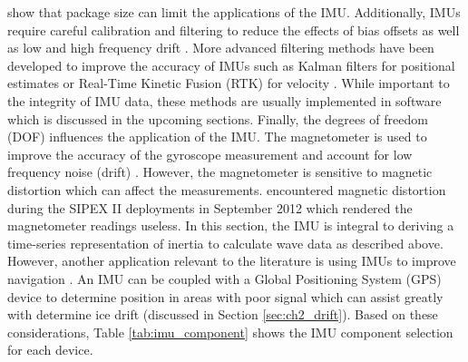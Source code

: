 \textcite{ahmad2013reviews} show that package size can limit the applications of the IMU. Additionally, IMUs require careful calibration and filtering to reduce the effects of bias offsets as well as low and high frequency drift \cite{fong2008methods}. More advanced filtering methods have been developed to improve the accuracy of IMUs such as Kalman filters \cite{simon2001kalman}  for positional estimates or Real-Time Kinetic Fusion (RTK) for velocity \cite{meng2014optimal}. While important to the integrity of IMU data, these methods are usually implemented in software which is discussed in the upcoming sections. Finally, the degrees of freedom (DOF) influences the application of the IMU. The magnetometer is used to improve the accuracy of the gyroscope measurement and account for low frequency noise (drift) \cite{ahmad2013reviews}. However, the magnetometer is sensitive to magnetic distortion which can affect the measurements. \textcite{kohout2015device} encountered magnetic distortion during the SIPEX II deployments in September 2012 which rendered the magnetometer readings useless. In this section, the IMU is integral to deriving a time-series representation of inertia to calculate wave data as described above. However, another application relevant to the literature is using IMUs to improve navigation \cite{ahmad2013reviews}. An IMU can be coupled with a Global Positioning System (GPS) device to determine position in areas with poor signal which can assist greatly with determine ice drift (discussed in Section \ref{sec:ch2_drift}). Based on these considerations, Table \ref{tab:imu_component} shows the IMU component selection for each device.

